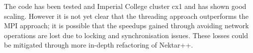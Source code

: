 The code has been tested and Imperial College cluster cx1 and has shown good
scaling.  However it is not yet clear that the threading approach outperforms
the MPI approach; it is possible that the speedups gained through avoiding
network operations are lost due to locking and synchronisation issues.  These
losses could be mitigated through more in-depth refactoring of Nektar++.